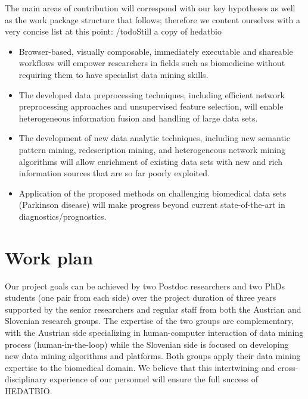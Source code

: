 \documentclass[a4paper,11pt]{article}
\begin{document}
The main areas of contribution will correspond with our key hypotheses as well as the work package structure that follows; therefore we content ourselves with a very concise list at this point: /todo{Still a copy of hedatbio}
\begin{itemize} 
  \item Browser-based, visually composable, immediately executable and shareable workflows will empower researchers in fields such as biomedicine without requiring them to have specialist data mining skills. 
  \item The developed data preprocessing techniques, including efficient network preprocessing approaches and unsupervised feature selection, will enable heterogeneous information fusion and handling of large data sets.
  \item The development of new data analytic techniques, including new semantic pattern mining, redescription mining,  and heterogeneous network mining algorithms will allow enrichment of existing data sets with new and rich information sources that are so far poorly exploited.
  \item Application of the proposed methods on challenging biomedical data sets (Parkinson disease) will make progress beyond current state-of-the-art in diagnostics/prognostics. 
\end{itemize}


%

%
%
\section{Work plan}

Our project goals can be achieved by two Postdoc researchers and two PhDs students (one pair from each side) over the project duration of three years
supported by the senior researchers and regular staff from both the Austrian and Slovenian research groups.
The expertise of the two groups are complementary, with the Austrian side specializing in human-computer interaction of data mining process (human-in-the-loop) while the Slovenian side is focused on developing new data mining algorithms and platforms. Both groups apply their data mining expertise to the biomedical domain. We believe that this intertwining and cross-disciplinary experience of our personnel will ensure the full success of HEDATBIO.
\\[-0,3cm]
\end{document}
